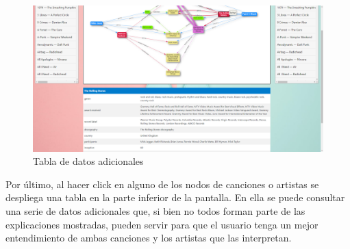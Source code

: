 \begin{figure}[h!]
	\centering
	\includegraphics[width = 1\textwidth]{Imagenes/Bitmap/Pantalla tabla.png}
	\caption{Tabla de datos adicionales}
	\label{fig:sampleImage}
\end{figure}

Por último, al hacer click en alguno de los nodos de canciones o artistas se despliega una tabla en la parte inferior de la pantalla. En ella se puede consultar una serie de datos adicionales que, si bien no todos forman parte de las explicaciones mostradas, pueden servir para que el usuario tenga un mejor entendimiento de ambas canciones y los artistas que las interpretan.\\
